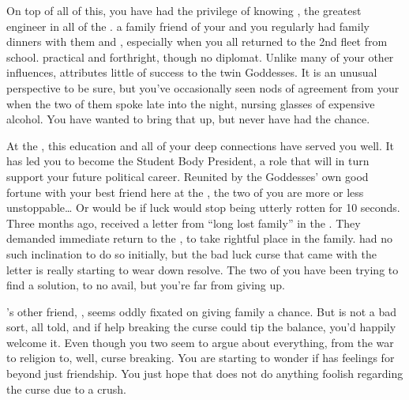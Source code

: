 \documentclass[char]{GL2020}
\begin{document}
On top of all of this, you have had the privilege of knowing \cBunker{\full}, the greatest engineer in all of the \pShippies{}. \cBunker{\Theyare} a family friend of your \cHeadDiplomat{\auncle} and you regularly had family dinners with them and \cInitiate{}, especially when you all returned to the 2nd fleet from school. \cBunker{\Theyare} practical and forthright, though no diplomat. Unlike many of your other influences, \cBunker{} attributes little of \cBunker{\their} success to the twin Goddesses. It is an unusual perspective to be sure, but you’ve occasionally seen nods of agreement from your \cHeadDiplomat{\auncle} when the two of them spoke late into the night, nursing glasses of expensive alcohol. You have wanted to bring that up, but never have had the chance.

At the \pSchool{}, this education and all of your deep connections have served you well. It has led you to become the Student Body President, a role that will in turn support your future political career. Reunited by the Goddesses' own good fortune with your best friend here at the \pSchool{}, the two of you are more or less unstoppable\ldots{} Or would be if \cInitiate{\their} luck would stop being utterly rotten for 10 seconds. Three months ago, \cInitiate{} received a letter from ``long lost family'' in the \pFarm{}. They demanded \cInitiate{\their} immediate return to the \pFarm{}, to take \cInitiate{\their} rightful place in the family. \cInitiate{} had no such inclination to do so initially, but the bad luck curse that came with the letter is really starting to wear down \cInitiate{\their} resolve. The two of you have been trying to find a solution, to no avail, but you're far from giving up. 

\cInitiate{}'s other friend, \cWarlordDaughter{\full}, seems oddly fixated on \cInitiate{} giving \cInitiate{\their} \pFarm{} family a chance. But \cWarlordDaughter{} is not a bad sort, all told, and if \cWarlordDaughter{\their} help breaking the curse could tip the balance, you'd happily welcome it. Even though you two seem to argue about everything, from the war to religion to, well, curse breaking. You are starting to wonder if \cInitiate{} has feelings for \cWarlordDaughter{} beyond just friendship. You just hope that \cInitiate{} does not do anything foolish regarding the curse due to a crush. 
\end{document}

